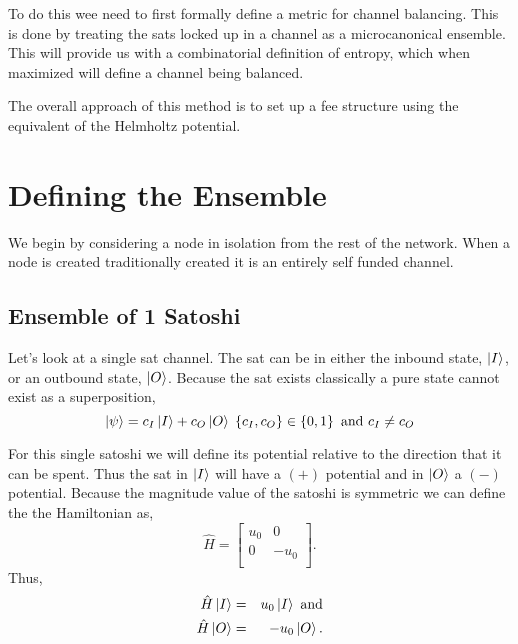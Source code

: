 \documentclass[review,12pt]{elsarticle}
\begin{document}
To do this wee need to first formally define a metric for channel balancing.
This is done by treating the sats locked up in a channel as a microcanonical ensemble.
This will provide us with a combinatorial definition of entropy, which when maximized will define a channel being balanced.

The overall approach of this method is to set up a fee structure using the equivalent of the Helmholtz potential.

\section{Defining the Ensemble}
We begin by considering a node in isolation from the rest of the network.
When a node is created traditionally created it is an entirely self funded channel.

\subsection{Ensemble of 1 Satoshi}
Let's look at a single sat channel.
The sat can be in either the inbound state, $\Ket{I}$, or an outbound state, $\Ket{O}$.
Because the sat exists classically a pure state cannot exist as a superposition,
\begin{equation}
  \Ket{\psi} = c_I\Ket{I} + c_O\Ket{O} \; \left\{c_I,c_O\right\} \in \left\{0,1\right\} \textrm{ and } c_I \neq c_O \nonumber
\end{equation}

For this single satoshi we will define its potential relative to the direction that it can be spent.
Thus the sat in $\Ket{I}$ will have a $(+)$ potential and in $\Ket{O}$ a $(-)$ potential.
Because the magnitude value of the satoshi is symmetric we can define the the Hamiltonian as,
\begin{equation}
  \hat{H} =   \left[ {\begin{array}{cc}
          u_0 & 0    \\
          0   & -u_0 \\
        \end{array} } \right].\nonumber
\end{equation}
Thus,
\begin{eqnarray}
  \hat{H}\Ket{I} & = & u_0\Ket{I} \textrm{ and} \nonumber\\
  \hat{H}\Ket{O} & = & -u_0\Ket{O}. \nonumber
\end{eqnarray}
\end{document}
